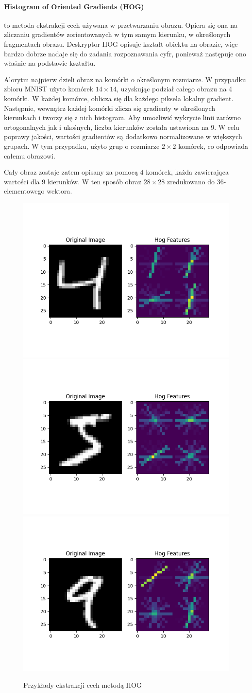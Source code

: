 \documentclass[10pt]{article}
\begin{document}
\paragraph{Histogram of Oriented Gradients (HOG)} to metoda ekstrakcji cech używana w przetwarzaniu obrazu.
Opiera się ona na zliczaniu gradientów zorientowanych w tym samym kierunku, w określonych fragmentach obrazu.
Deskryptor HOG opisuje kształt obiektu na obrazie, więc bardzo dobrze nadaje się do zadania rozpoznawania cyfr, ponieważ następuje ono właśnie na podstawie kształtu.

Alorytm najpierw dzieli obraz na komórki o określonym rozmiarze. W przypadku zbioru MNIST użyto komórek $14\times14$, uzyskując podział całego obrazu na 4 komórki.
W każdej komórce, oblicza się dla każdego piksela lokalny gradient.
Następnie, wewnątrz każdej komórki zlicza się gradienty w określonych kierunkach i tworzy się z nich histogram.
Aby umożliwić wykrycie linii zarówno ortogonalnych jak i ukośnych, liczba kierunków została ustawiona na 9.
W celu poprawy jakości, wartości gradientów są dodatkowo normalizowane w większych grupach.
W tym przypadku, użyto grup o rozmiarze $2\times2$ komórek, co odpowiada całemu obrazowi.

Cały obraz zostaje zatem opisany za pomocą 4 komórek, każda zawierająca wartości dla 9 kierunków.
W ten sposób obraz $28\times28$ zredukowano do 36-elementowego wektora.

\begin{figure}[H]\centering
    \includegraphics[width=.32\linewidth]{img/hog_vis/4.png}
    \hfill
    \includegraphics[width=.32\linewidth]{img/hog_vis/5.png}
    \hfill
    \includegraphics[width=.32\linewidth]{img/hog_vis/9.png}
    \caption{Przykłady ekstrakcji cech metodą HOG}
\end{figure}
\end{document}
